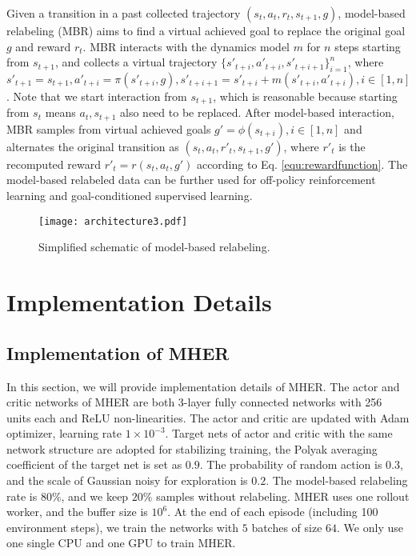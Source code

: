 \documentclass{article}
\begin{document}
Given a transition in a past collected trajectory $(s_t, a_t, r_t, s_{t+1}, g)$, model-based relabeling (MBR) aims to find a virtual achieved goal to replace the original goal $g$ and reward $r_t$. MBR interacts with the dynamics model $m$ for $n$ steps starting from $s_{t+1}$, and collects a virtual trajectory $\{s'_{t+i}, a'_{t+i}, s'_{t+i+1}\}_{i=1}^{n}$, where $s'_{t+1}=s_{t+1}, a'_{t+i}=\pi(s'_{t+i},g), s'_{t+i+1}=s'_{t+i}+m(s'_{t+i},a'_{t+i}), i\in[1,n]$. Note that we start interaction from $s_{t+1}$, which is reasonable because starting from $s_t$ means $a_t, s_{t+1}$ also need to be replaced. After model-based interaction, MBR samples from virtual achieved goals $g'=\phi(s_{t+i}), i\in[1,n]$ and alternates the original transition as $(s_t,a_t, r'_t, s_{t+1},g')$, where $r'_t$ is the recomputed reward $r'_t=r(s_t,a_t,g')$ according to Eq. \ref{equ:rewardfunction}. The model-based relabeled data can be further used for off-policy reinforcement learning and goal-conditioned supervised learning.
\begin{figure}[htb]
    \centering
    \texttt{[image: architecture3.pdf]}
    \caption{Simplified schematic of model-based relabeling.}
    \label{fig:diagram_ap}
\end{figure}



\section{Implementation Details}
\label{ap:implementation_detail}
\subsection{Implementation of MHER}
In this section, we will provide implementation details of MHER. The actor and critic networks of MHER are both 3-layer fully connected networks with 256 units each and ReLU non-linearities. The actor and critic are updated with Adam optimizer, learning rate $1\times 10^{-3}$. Target nets of actor and critic with the same network structure are adopted for stabilizing training, the Polyak averaging coefficient of the target net is set as $0.9$. The probability of random action is $0.3$, and the scale of Gaussian noisy for exploration is $0.2$. The model-based relabeling rate is $80\%$, and we keep $20\%$ samples without relabeling. MHER uses one rollout worker, and the buffer size is $10^6$. At the end of each episode (including 100 environment steps), we train the networks with $5$ batches of size $64$. We only use one single CPU and one GPU to train MHER. 
\end{document}
